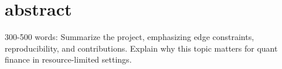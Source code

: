 \section{abstract}
\label{sec:abstract}

300-500 words: Summarize the project, emphasizing edge constraints, reproducibility, and contributions. Explain why this topic matters for quant finance in resource-limited settings.